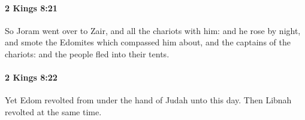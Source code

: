 		\paragraph{2 Kings 8:21} %
			\label{2KINGS-8-21}

			So Joram went over to Zair, and all the chariots with him: and he rose by night, and smote the Edomites which compassed him about, and the captains of the chariots: and the people fled into their tents.


		\paragraph{2 Kings 8:22} %
			\label{2KINGS-8-22}

			Yet Edom revolted from under the hand of Judah unto this day. Then Libnah revolted at the same time.


